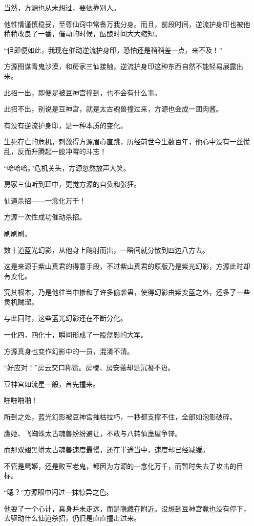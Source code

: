 \begin{this_body}
当然，方源也从未想过，要依靠别人。

他性情谨慎稳妥，至尊仙窍中常备万我分身。而且，前段时间，逆流护身印也被他稍稍改良了一番，催动的时候，酝酿时间大大缩短。

“但即便如此，我现在催动逆流护身印，恐怕还是稍稍差一点，来不及！”

方源图谋青鬼沙漠，和房家三仙接触，逆流护身印这种东西自然不能轻易展露出来。

此招一出，即便是被豆神宫撞到，也不会有什么事。

此招不出，别说是豆神宫，就是太古魂兽撞过来，方源也会成一团肉酱。

有没有逆流护身印，是一种本质的变化。

生死存亡的危机，刺激得方源眉心直跳，历经前世今生数百年，他心中没有一丝慌乱，反而升腾起一股冲霄的斗志！

“哈哈哈。”危机关头，方源忽然放声大笑。

房家三仙听到耳中，更觉方源的自负和张狂。

仙道杀招——一念化万千！

方源一次性成功催动杀招。

刷刷刷。

数十道蓝光幻影，从他身上飚射而出，一瞬间就分散到四边八方去。

这是来源于紫山真君的得意手段，不过紫山真君的原版乃是紫光幻影，方源此时却有变化。

究其根本，乃是他往当中掺和了许多偷袭蛊，使得幻影由紫变蓝之外，还多了一些灵机贼溜。

与此同时，这些蓝光幻影还在不断分化。

一化四，四化十，瞬间形成了一股蓝影的大军。

方源真身也变作幻影中的一员，混淆不清。

“好应对！”房云交口称赞。房棱、房安蕾却是沉凝不语。

豆神宫如流星一般，首先撞来。

啪啪啪啪！

所到之处，蓝光幻影被豆神宫摧枯拉朽，一秒都支撑不住，全部如泡影破碎。

鹰姬、飞蜘蛛太古魂兽纷纷避让，不敢与八转仙蛊屋争锋。

而那双翅黑蟒太古魂兽速度最慢，还在半途当中，速度却已经减缓。

不管是鹰姬，还是败军老鬼，都因为方源的一念化万千，而暂时失去了攻击的目标。

“嗯？”方源眼中闪过一抹惊异之色。

他耍了一个心计，真身并未走远，而是隐藏在附近。没想到豆神宫竟也没有停下，去驱动什么仙道杀招，仍旧是直直撞击过来。


\end{this_body}
